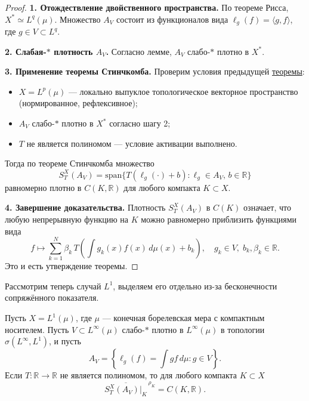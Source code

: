 \documentclass[../NDCNNAI_main.tex]{subfiles}
\begin{document}
\begin{proof}
    \textbf{1. Отождествление двойственного пространства.} По теореме Рисса, \( X^* \simeq L^q(\mu) \). Множество \( A_V \) состоит из функционалов вида \( \ell_g(f) = \langle g, f \rangle \), где \( g \in V \subset L^q \).

    \textbf{2. Слабая-$\ast$ плотность \( A_V \).} Согласно лемме, \( A_V \) слабо-$\ast$ плотно в \( X^* \).

    \textbf{3. Применение теоремы Стинчкомба.} Проверим условия предыдущей \hyperref[thm:stinchcombe]{теоремы}:
    \begin{itemize}
        \item \( X = L^p(\mu) \) --- локально выпуклое топологическое векторное пространство (нормированное, рефлексивное);
        \item \( A_V \) слабо-$\ast$ плотно в \( X^* \) согласно шагу 2;
        \item \( T \) не является полиномом --- условие активации выполнено.
    \end{itemize}
    Тогда по теореме Стинчкомба множество 
    \[
    S_T^X(A_V) = \mathrm{span}\{ T(\ell_g(\cdot) + b) : \ell_g \in A_V, \, b \in \mathbb{R} \}
    \]
    равномерно плотно в \( C(K, \mathbb{R}) \) для любого компакта \( K \subset X \).

    \textbf{4. Завершение доказательства.} Плотность \( S_T^X(A_V) \) в \( C(K) \) означает, что любую непрерывную функцию на \( K \) можно равномерно приблизить функциями вида
    \[
    f \mapsto \sum_{k=1}^N \beta_k \, T\!\left( \int g_k(x) f(x) \, d\mu(x) + b_k \right), \quad g_k \in V, \; b_k, \beta_k \in \mathbb{R}.
    \]
    Это и есть утверждение теоремы.
\end{proof}
Рассмотрим теперь случай $L^1$, выделяем его отдельно из-за бесконечности сопряжённого показателя.
\begin{theorem}
\label{thm:functional-UAT-L1}
Пусть \( X = L^1(\mu) \), где \(\mu\) --- конечная борелевская мера с компактным носителем. 
Пусть \( V \subset L^\infty(\mu) \) слабо-$\ast$ плотно в \( L^\infty(\mu) \) в топологии \( \sigma(L^\infty, L^1) \), и пусть 
\[
A_V = \left\{ \ell_g(f) = \int g f \, d\mu : g \in V \right\}.
\]
Если \( T\colon \mathbb{R} \to \mathbb{R} \) не является полиномом, то для любого компакта \( K \subset X \)
\[
\overline{S_T^X(A_V)|_K}^{\,\rho_K} = C(K, \mathbb{R}).
\]
\end{theorem}
\end{document}
